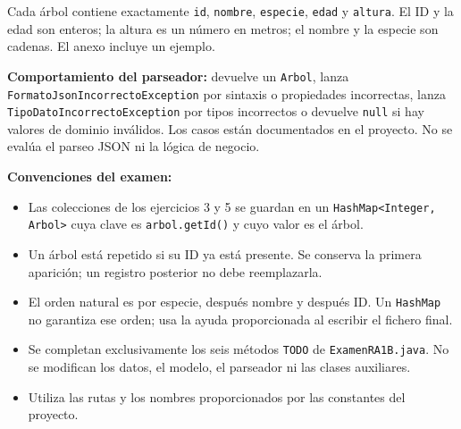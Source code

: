\documentclass[a4paper,12pt]{article}
\begin{document}
Cada árbol contiene exactamente \texttt{id}, \texttt{nombre}, \texttt{especie}, \texttt{edad} y \texttt{altura}. El ID y la edad son enteros; la altura es un número en metros; el nombre y la especie son cadenas. El anexo incluye un ejemplo.\par

\textbf{Comportamiento del parseador:} devuelve un \texttt{Arbol}, lanza \texttt{F\allowbreak{}o\allowbreak{}r\allowbreak{}m\allowbreak{}a\allowbreak{}t\allowbreak{}o\allowbreak{}J\allowbreak{}s\allowbreak{}o\allowbreak{}n\allowbreak{}I\allowbreak{}n\allowbreak{}c\allowbreak{}o\allowbreak{}r\allowbreak{}r\allowbreak{}e\allowbreak{}c\allowbreak{}t\allowbreak{}o\allowbreak{}E\allowbreak{}x\allowbreak{}c\allowbreak{}e\allowbreak{}p\allowbreak{}t\allowbreak{}i\allowbreak{}o\allowbreak{}n} por sintaxis o propiedades incorrectas, lanza \texttt{T\allowbreak{}i\allowbreak{}p\allowbreak{}o\allowbreak{}D\allowbreak{}a\allowbreak{}t\allowbreak{}o\allowbreak{}I\allowbreak{}n\allowbreak{}c\allowbreak{}o\allowbreak{}r\allowbreak{}r\allowbreak{}e\allowbreak{}c\allowbreak{}t\allowbreak{}o\allowbreak{}E\allowbreak{}x\allowbreak{}c\allowbreak{}e\allowbreak{}p\allowbreak{}t\allowbreak{}i\allowbreak{}o\allowbreak{}n} por tipos incorrectos o devuelve \texttt{null} si hay valores de dominio inválidos. Los casos están documentados en el proyecto. No se evalúa el parseo JSON ni la lógica de negocio.\par

\textbf{Convenciones del examen:}\par

\begin{itemize}
\item Las colecciones de los ejercicios 3 y 5 se guardan en un \texttt{H\allowbreak{}a\allowbreak{}s\allowbreak{}h\allowbreak{}M\allowbreak{}a\allowbreak{}p\allowbreak{}<\allowbreak{}I\allowbreak{}n\allowbreak{}t\allowbreak{}e\allowbreak{}g\allowbreak{}e\allowbreak{}r\allowbreak{},\allowbreak{} \allowbreak{}A\allowbreak{}r\allowbreak{}b\allowbreak{}o\allowbreak{}l\allowbreak{}>} cuya clave es \texttt{arbol.getId()} y cuyo valor es el árbol.
\item Un árbol está repetido si su ID ya está presente. Se conserva la primera aparición; un registro posterior no debe reemplazarla.
\item El orden natural es por especie, después nombre y después ID. Un \texttt{HashMap} no garantiza ese orden; usa la ayuda proporcionada al escribir el fichero final.
\item Se completan exclusivamente los seis métodos \texttt{TODO} de \texttt{ExamenRA1B.java}. No se modifican los datos, el modelo, el parseador ni las clases auxiliares.
\item Utiliza las rutas y los nombres proporcionados por las constantes del proyecto.
\end{itemize}
\end{document}
